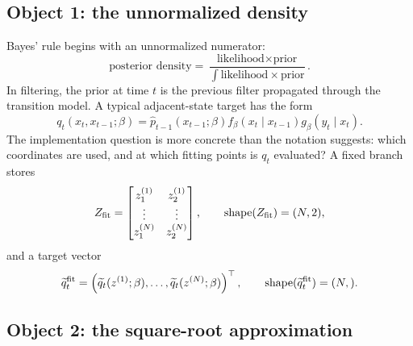 \documentclass[11pt]{article}
\numberwithin{equation}{section}
\newcommand{\shape}{\operatorname{shape}}
\begin{document}
\subsection*{Object 1: the unnormalized density}

Bayes' rule begins with an unnormalized numerator:
\begin{equation}
    \text{posterior density}
    =
    \frac{\text{likelihood}\times\text{prior}}
    {\int \text{likelihood}\times\text{prior}}.
    \label{eq:p24-p22-o2}
\end{equation}
In filtering, the prior at time \(t\) is the previous filter propagated through
the transition model.  A typical adjacent-state target has the form
\begin{equation}
    q_t(x_t,x_{t-1};\beta)
    =
    \widehat p_{t-1}(x_{t-1};\beta)
    f_\beta(x_t\mid x_{t-1})
    g_\beta(y_t\mid x_t).
    \label{eq:p24-p22-o3}
\end{equation}
The implementation question is more concrete than the notation suggests:
which coordinates are used, and at which fitting points is \(q_t\) evaluated?
A fixed branch stores
\begin{equation}
    Z_{\rm fit}
    =
    \begin{bmatrix}
    z_1^{(1)} & z_2^{(1)}\\
    \vdots & \vdots\\
    z_1^{(N)} & z_2^{(N)}
    \end{bmatrix},
    \qquad
    \shape(Z_{\rm fit})=(N,2),
    \label{eq:p24-p22-o4}
\end{equation}
and a target vector
\begin{equation}
    \widetilde q_t^{\rm fit}
    =
    \left(
    \widetilde q_t(z^{(1)};\beta),\ldots,
    \widetilde q_t(z^{(N)};\beta)
    \right)^\top,
    \qquad
    \shape(\widetilde q_t^{\rm fit})=(N,).
    \label{eq:p24-p22-o5}
\end{equation}

\subsection*{Object 2: the square-root approximation}
\end{document}
